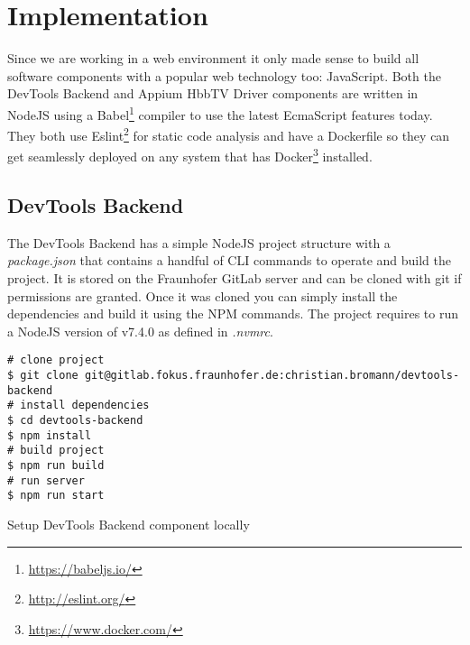 %

\chapter{Implementation\label{cha:implementation}}

Since we are working in a web environment it only made sense to build all software components with a
popular web technology too: JavaScript. Both the DevTools Backend and Appium HbbTV Driver components
are written in NodeJS using a Babel\footnote{\url{https://babeljs.io/}} compiler to use the latest
EcmaScript features today. They both use Eslint\footnote{\url{http://eslint.org/}} for static code
analysis and have a Dockerfile so they can get seamlessly deployed on any system that has Docker\footnote{\url{https://www.docker.com/}}
installed.

\section{DevTools Backend\label{sec:implDevtoolsBackend}}

The DevTools Backend has a simple NodeJS project structure with a \textit{package.json} that contains
a handful of CLI commands to operate and build the project. It is stored on the Fraunhofer GitLab
server and can be cloned with git if permissions are granted. Once it was cloned you can simply install
the dependencies and build it using the NPM commands. The project requires to run a NodeJS version
of v7.4.0 as defined in \textit{.nvmrc}.

\vspace{1cm}
\begin{listing}[H]
\begin{verbatim}
# clone project
$ git clone git@gitlab.fokus.fraunhofer.de:christian.bromann/devtools-backend
# install dependencies
$ cd devtools-backend
$ npm install
# build project
$ npm run build
# run server
$ npm run start
\end{verbatim}
\caption{Setup DevTools Backend component locally}
\label{lst:setupdevtools}
\end{listing}
\vspace{0.5cm}

